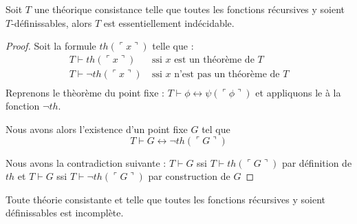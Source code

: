 \begin{theoreme}
	Soit $T$ une théorique consistance telle que toutes les fonctions récursives
	y soient $T$-définissables, alors $T$ est essentiellement indécidable.
\end{theoreme}
\begin{proof}
        Soit la formule $th(\ulcorner x \urcorner)$ telle que :
	\begin{align*}
	T \vdash th(\ulcorner x \urcorner) \ &\text{ssi $x$ est un théorème de $T$} \\
	T \vdash \neg th(\ulcorner x \urcorner) \ &\text{ssi $x$ n'est pas un théorème de $T$} \\
	\end{align*}
	Reprenons le thèorème du point fixe :
	 $ T \vdash \phi \leftrightarrow \psi (\ulcorner \phi\urcorner ) $ et appliquons le à
	 la fonction $\neg th$.
	 
	  Nous avons alors l'existence d'un point fixe $G$ tel que
	  $$T \vdash G \leftrightarrow \neg th (\ulcorner G \urcorner ) $$ 

	  Nous avons la contradiction suivante : $T \vdash G$ ssi $T \vdash th(\ulcorner G \urcorner)$ par définition de $th$
	  et $T \vdash G$ ssi $T \vdash \neg th (\ulcorner G \urcorner)$ par construction de $G$
\end{proof}

\begin{theoreme}
	Toute théorie consistante et telle que toutes les fonctions récursives y soient définissables
	est incomplète.	
\end{theoreme}


